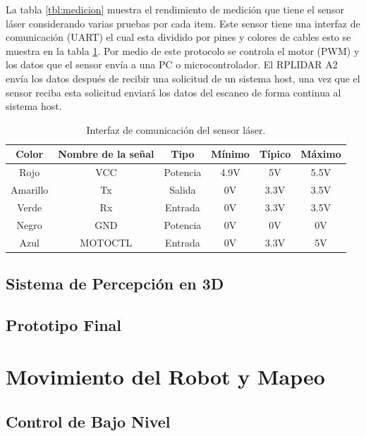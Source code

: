 La tabla \ref{tbl:medicion} muestra el rendimiento de medici\'on \cite{Slamtec} 
que tiene el sensor l\'aser considerando varias pruebas por cada item. Este 
sensor tiene una interfaz de comunicaci\'on (UART) el cual esta dividido por 
pines y colores de cables esto se muestra en la tabla \ref{tbl:comunicacion}. Por 
medio de este protocolo se controla el motor (PWM) y los datos que el sensor 
env\'ia a una PC o microcontrolador. El RPLIDAR A2 env\'ia los datos despu\'es de 
recibir una solicitud de un sistema host, una vez que el sensor reciba esta 
solicitud enviar\'a los datos del escaneo de forma continua al sistema host.
\begin{table}[htbp]
\begin{center}
\begin{tabular}{|c|c|c|c|c|c|}
\hline
Color & Nombre de la se\~nal & Tipo & M\'inimo & T\'ipico & M\'aximo \\ 
\hline \hline
Rojo & VCC & Potencia & 4.9V & 5V & 5.5V \\ \hline
Amarillo & Tx & Salida & 0V & 3.3V & 3.5V \\ \hline
Verde & Rx & Entrada & 0V & 3.3V & 3.5V \\ \hline
Negro & GND & Potencia & 0V & 0V & 0V \\ \hline
Azul & MOTOCTL & Entrada & 0V & 3.3V & 5V \\ \hline
\end{tabular}
\caption{Interfaz de comunicaci\'on del sensor l\'aser.}
\label{tbl:comunicacion}
\end{center}
\end{table}

\subsection{Sistema de Percepci\'on en 3D}

\subsection{Prototipo Final}


\section{Movimiento del Robot y Mapeo}

\subsection{Control de Bajo Nivel}

